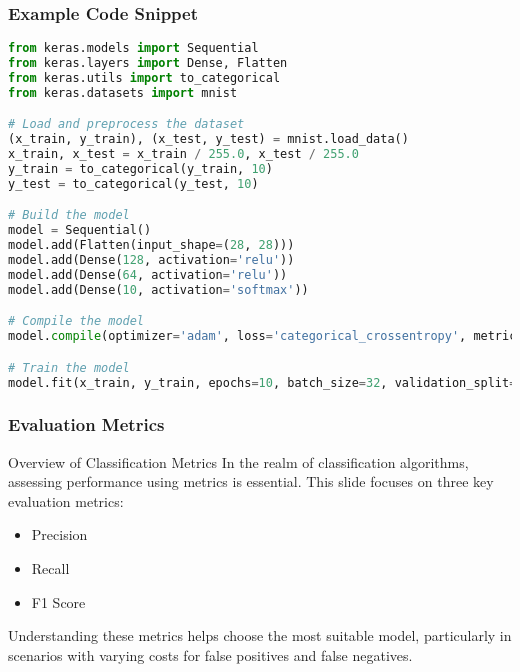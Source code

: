 \documentclass{beamer}
\begin{document}
\begin{frame}[fragile]
    \frametitle{Example Code Snippet}
    \begin{lstlisting}[language=Python]
from keras.models import Sequential
from keras.layers import Dense, Flatten
from keras.utils import to_categorical
from keras.datasets import mnist

# Load and preprocess the dataset
(x_train, y_train), (x_test, y_test) = mnist.load_data()
x_train, x_test = x_train / 255.0, x_test / 255.0
y_train = to_categorical(y_train, 10)
y_test = to_categorical(y_test, 10)

# Build the model
model = Sequential()
model.add(Flatten(input_shape=(28, 28)))
model.add(Dense(128, activation='relu'))
model.add(Dense(64, activation='relu'))
model.add(Dense(10, activation='softmax'))

# Compile the model
model.compile(optimizer='adam', loss='categorical_crossentropy', metrics=['accuracy'])

# Train the model
model.fit(x_train, y_train, epochs=10, batch_size=32, validation_split=0.2)
    \end{lstlisting}
\end{frame}

\begin{frame}[fragile]
    \frametitle{Evaluation Metrics}
    \begin{block}{Overview of Classification Metrics}
        In the realm of classification algorithms, assessing performance using metrics is essential. This slide focuses on three key evaluation metrics: 
        \begin{itemize}
            \item Precision
            \item Recall
            \item F1 Score
        \end{itemize}
        Understanding these metrics helps choose the most suitable model, particularly in scenarios with varying costs for false positives and false negatives.
    \end{block}
\end{frame}
\end{document}
